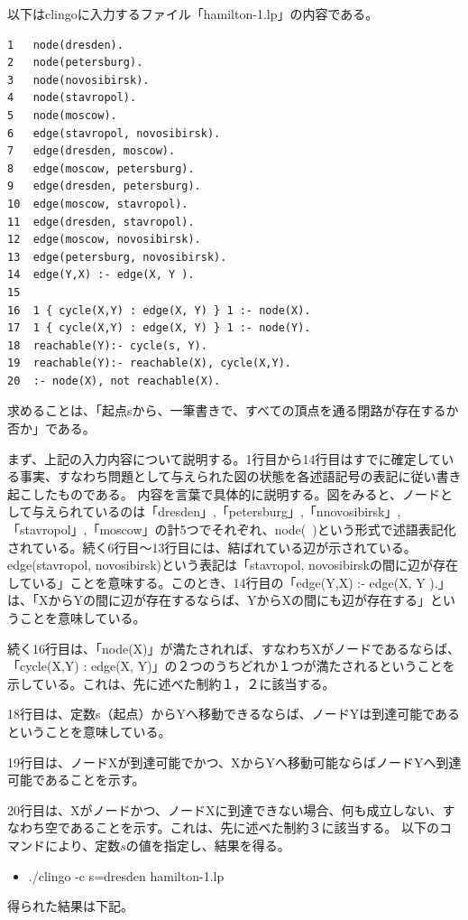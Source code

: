 \documentclass[dvipdfmx]{jsarticle}
\begin{document}
以下はclingoに入力するファイル「hamilton-1.lp」の内容である。
\begin{verbatim}
1   node(dresden).
2   node(petersburg).
3   node(novosibirsk).
4   node(stavropol).
5   node(moscow).
6   edge(stavropol, novosibirsk).
7   edge(dresden, moscow).
8   edge(moscow, petersburg).
9   edge(dresden, petersburg).
10  edge(moscow, stavropol).
11  edge(dresden, stavropol).
12  edge(moscow, novosibirsk).
13  edge(petersburg, novosibirsk).
14  edge(Y,X) :- edge(X, Y ).
15
16  1 { cycle(X,Y) : edge(X, Y) } 1 :- node(X).
17  1 { cycle(X,Y) : edge(X, Y) } 1 :- node(Y).
18  reachable(Y):- cycle(s, Y).
19  reachable(Y):- reachable(X), cycle(X,Y).
20  :- node(X), not reachable(X).
\end{verbatim}
求めることは、「起点sから、一筆書きで、すべての頂点を通る閉路が存在するか否か」である。\par
まず、上記の入力内容について説明する。1行目から14行目はすでに確定している事実、すなわち問題として与えられた図の状態を各述語記号の表記に従い書き起こしたものである。
内容を言葉で具体的に説明する。図をみると、ノードとして与えられているのは「dresden」,「petersburg」,「nnovosibirsk」,「stavropol」,「moscow」の計5つでそれぞれ、node(~)という形式で述語表記化されている。続く6行目〜13行目には、結ばれている辺が示されている。edge(stavropol, novosibirsk)という表記は「stavropol, novosibirskの間に辺が存在している」ことを意味する。このとき、14行目の「edge(Y,X) :- edge(X, Y ).」は、「XからYの間に辺が存在するならば、YからXの間にも辺が存在する」ということを意味している。\par
続く16行目は、「node(X)」が満たされれば、すなわちXがノードであるならば、「cycle(X,Y) : edge(X, Y)」の２つのうちどれか１つが満たされるということを示している。これは、先に述べた制約１，２に該当する。\par
18行目は、定数s（起点）からYへ移動できるならば、ノードYは到達可能であるということを意味している。\par
19行目は、ノードXが到達可能でかつ、XからYへ移動可能ならばノードYへ到達可能であることを示す。\par
20行目は、Xがノードかつ、ノードXに到達できない場合、何も成立しない、すなわち空であることを示す。これは、先に述べた制約３に該当する。
以下のコマンドにより、定数$s$の値を指定し、結果を得る。
\begin{itemize}
  \item ./clingo -c s=dresden hamilton-1.lp
\end{itemize}
得られた結果は下記。
\end{document}
